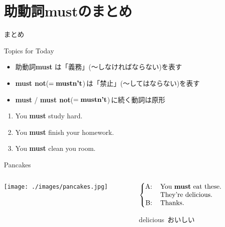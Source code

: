 \documentclass[aspectratio=169,xcolor={dvipsnames,table}]{beamer}
\begin{document}
\section{助動詞mustのまとめ}
\begin{frame}[plain]{まとめ}
 \Large

\begin{block}{Topics for Today}
\small
\begin{itemize}[square]
 \item<2->  助動詞{\bfseries must} は「義務」(〜しなければならない)を表す%
\hfill{}{\scriptsize {}}
 \item<3->  {\bfseries must not}($=\text{\bfseries mustn't}$)\,は「禁止」(〜してはならない)を表す%
\hfill{}{\scriptsize {}}
 \item<4->  {\bfseries must} / {\bfseries must not}($=\text{\bfseries mustn't}$)\,に続く動詞は原形
\end{itemize}
\end{block}

\vfill


\end{frame}
\begin{frame}[plain]
 \large

\begin{enumerate}
 \item You \textbf{must} study hard.
 \item You \textbf{must} finish your homework.
 \item You \textbf{must} clean you room.
\end{enumerate}

\end{frame}
\begin{frame}[plain]{Pancakes}
\begin{columns}
\begin{column}{.5\textwidth}
 \texttt{[image: ./images/pancakes.jpg]}
\end{column}
\begin{column}{.4\textwidth}\large
$\left\{
\begin{tabular}{@{}rl}
A:& You \textbf{must} eat these. \\
&They're delicious.\\
B:& Thanks.
\end{tabular}\right.$

\bigskip

\bigskip

\bigskip

\hfill{\scriptsize delicious  \,おいしい}
\end{column}
\end{columns}
\end{frame}
\end{document}
